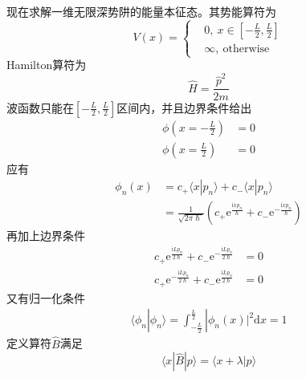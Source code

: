         现在求解一维无限深势阱的能量本征态。其势能算符为
        \begin{equation}
            V(x) = \left \{
                \begin{aligned}
                    &0,\ x\in [-\frac L2, \frac L2 ]\\
                    &\infty, \ \mathrm{otherwise}
                \end{aligned}
                \right.
        \end{equation}
        Hamilton算符为
        \begin{equation}
            \hat{H} = \frac {\hat{p}^2}{2m}
        \end{equation}
        波函数只能在$[-\frac L2, \frac L2 ]$区间内，并且边界条件给出
        \begin{equation}\begin{aligned}
            \phi(x = -\frac L2) &= 0\\
            \phi(x = \frac L2) &= 0
        \end{aligned}\end{equation}
        应有
        \begin{equation}\begin{aligned}
            \phi_n(x) &= c_+ \langle x|p_n\rangle + c_- \langle x|p_n\rangle\\
            &= \frac 1{\sqrt{2\pi \hslash}}(c_+\mathrm{e}^{\frac {\mathrm{i}xp_n}{\hslash}}+c_-\mathrm{e}^{-\frac {\mathrm{i}xp_n}{\hslash}})
        \end{aligned}\end{equation}
        再加上边界条件
        \begin{equation}\begin{aligned}
            c_+\mathrm{e}^{\frac {\mathrm{i}Lp_n}{2\hslash}}+c_-\mathrm{e}^{-\frac {\mathrm{i}Lp_n}{2\hslash}} &= 0\\
            c_+\mathrm{e}^{-\frac {\mathrm{i}Lp_n}{2\hslash}}+c_-\mathrm{e}^{\frac {\mathrm{i}Lp_n}{2\hslash}} &= 0
        \end{aligned}\end{equation}
        又有归一化条件
        \begin{equation}\begin{aligned}
            \langle \phi_n | \phi_n \rangle = \int_{-\frac L2}^{\frac L2} |\phi_n(x)|^2 \mathrm{d}x = 1
        \end{aligned}\end{equation}
        定义算符$\hat{B}$满足
        \[ \langle x|\hat{B}| p \rangle = \langle x+\lambda |p\rangle \]
